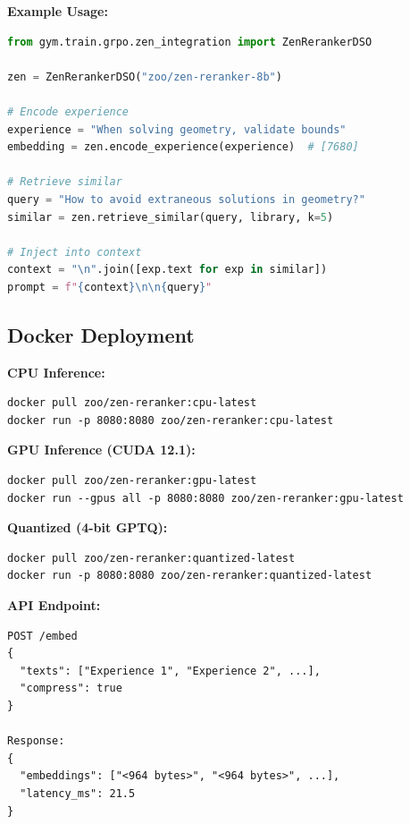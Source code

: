 \textbf{Example Usage:}
\begin{lstlisting}[language=Python, basicstyle=\small\ttfamily]
from gym.train.grpo.zen_integration import ZenRerankerDSO

zen = ZenRerankerDSO("zoo/zen-reranker-8b")

# Encode experience
experience = "When solving geometry, validate bounds"
embedding = zen.encode_experience(experience)  # [7680]

# Retrieve similar
query = "How to avoid extraneous solutions in geometry?"
similar = zen.retrieve_similar(query, library, k=5)

# Inject into context
context = "\n".join([exp.text for exp in similar])
prompt = f"{context}\n\n{query}"
\end{lstlisting}

\subsection{Docker Deployment}

\textbf{CPU Inference:}
\begin{verbatim}
docker pull zoo/zen-reranker:cpu-latest
docker run -p 8080:8080 zoo/zen-reranker:cpu-latest
\end{verbatim}

\textbf{GPU Inference (CUDA 12.1):}
\begin{verbatim}
docker pull zoo/zen-reranker:gpu-latest
docker run --gpus all -p 8080:8080 zoo/zen-reranker:gpu-latest
\end{verbatim}

\textbf{Quantized (4-bit GPTQ):}
\begin{verbatim}
docker pull zoo/zen-reranker:quantized-latest
docker run -p 8080:8080 zoo/zen-reranker:quantized-latest
\end{verbatim}

\textbf{API Endpoint:}
\begin{verbatim}
POST /embed
{
  "texts": ["Experience 1", "Experience 2", ...],
  "compress": true
}

Response:
{
  "embeddings": ["<964 bytes>", "<964 bytes>", ...],
  "latency_ms": 21.5
}
\end{verbatim}

